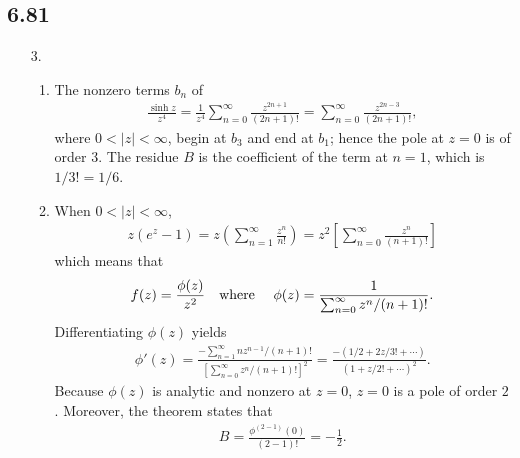 \documentclass[a4paper,12pt]{article}
\begin{document}
\subsection*{6.81}
\begin{enumerate}
    \item[3.]
        \begin{enumerate}
            \item
                The nonzero terms $b_n$ of
                \begin{align*}
                    \frac{\sinh z}{z^4} = \frac{1}{z^4} \sum_{n = 0}^\infty \frac{z^{2n + 1}}{(2n + 1)!} = \sum_{n = 0}^\infty \frac{z^{2n - 3}}{(2n + 1)!},
                \end{align*}
                where $0 < |z| < \infty$, begin at $b_3$ and end at $b_1$; hence the pole at $z = 0$ is of order $3$. The residue $B$ is the coefficient of the term at $n = 1$, which is $1/3! = 1/6$.

            \item
                When $0 < |z| < \infty$,
                \begin{align*}
                    z(e^z - 1) = z \left( \sum_{n = 1}^\infty \frac{z^n}{n!} \right) = z^2 \left[ \sum_{n = 0}^\infty \frac{z^n}{(n + 1)!} \right]
                \end{align*}
                which means that
                \begin{align*}
                    f(z) = \frac{\phi(z)}{z^2} \text{\quad where \quad} \phi(z) = \frac{1}{\sum_{n = 0}^\infty z^n / (n + 1)!}.
                \end{align*}
                Differentiating $\phi(z)$ yields
                \begin{align*}
                    \phi'(z) = \frac{-\sum_{n = 1}^\infty nz^{n - 1} / (n + 1)!}{\left[ \sum_{n = 0}^\infty z^n / (n + 1)! \right]^2} = \frac{-(1/2 + 2z/3! + \cdots)}{(1 + z/2! + \cdots)^2}.
                \end{align*}
                Because $\phi(z)$ is analytic and nonzero at $z = 0$, $z = 0$ is a pole of order $2$. Moreover, the theorem states that
                \begin{align*}
                    B = \frac{\phi^{(2 - 1)}(0)}{(2 - 1)!} = -\frac{1}{2}.
                \end{align*}
        \end{enumerate}


\end{enumerate}
\end{document}
